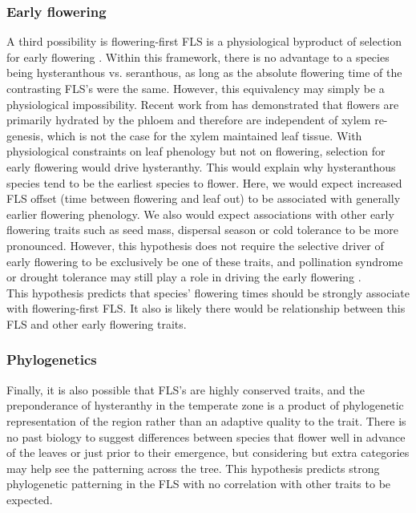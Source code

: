 \documentclass[12pt]{article}\usepackage[]{graphicx}\usepackage[]{color}
\begin{document}
\subsubsection*{Early flowering}
\indent\indent A third possibility is flowering-first FLS is a physiological byproduct of selection for early flowering \citep{Primack1987}. %
Within this framework, there is no advantage to a species being hysteranthous vs. seranthous, as long as the absolute flowering time of the contrasting FLS's were the same. However, this equivalency may simply be a physiological impossibility. Recent work from \citet{Savage2019} has demonstrated that flowers are primarily hydrated by the phloem and therefore are independent of xylem re-genesis, which is not the case for the xylem maintained leaf tissue. With physiological constraints on leaf phenology but not on flowering, selection for early flowering would drive hysteranthy. This would explain why hysteranthous species tend to be the earliest species to flower. Here, we would expect increased FLS offset (time between flowering and leaf out) to be associated with generally earlier flowering phenology. We also would expect associations with other early flowering traits such as seed mass, dispersal season or cold tolerance to be more pronounced. However, this hypothesis does not require the selective driver of early flowering to be exclusively be one of these traits, and pollination syndrome or drought tolerance may still play a role in driving the early flowering \citep{Savage2019}.\\
\indent This hypothesis predicts that species' flowering times should be strongly associate with flowering-first FLS. It also is likely there would be relationship between this FLS and other early flowering traits.
\subsubsection*{Phylogenetics} 
\indent\indent Finally, it is also possible that FLS's are highly conserved traits, and the preponderance of hysteranthy in the temperate zone is a product of phylogenetic representation of the region rather than an adaptive quality to the trait. There is no past biology to suggest differences between species that flower well in advance of the leaves or just prior to their emergence, but considering but extra categories may help see the patterning across the tree. %
This hypothesis predicts strong phylogenetic patterning in the FLS with no correlation with other traits to be expected.\\
\end{document}
